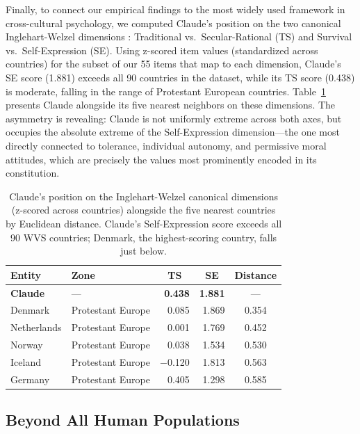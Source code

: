 \documentclass{article}
\begin{document}
Finally, to connect our empirical findings to the most widely used framework in cross-cultural psychology, we computed Claude's position on the two canonical Inglehart-Welzel dimensions \citep{inglehart2005modernization}: Traditional vs.\ Secular-Rational (TS) and Survival vs.\ Self-Expression (SE). Using z-scored item values (standardized across countries) for the subset of our 55 items that map to each dimension, Claude's SE score (1.881) exceeds all 90 countries in the dataset, while its TS score (0.438) is moderate, falling in the range of Protestant European countries. Table~\ref{tab:iw_dimensions} presents Claude alongside its five nearest neighbors on these dimensions. The asymmetry is revealing: Claude is not uniformly extreme across both axes, but occupies the absolute extreme of the Self-Expression dimension---the one most directly connected to tolerance, individual autonomy, and permissive moral attitudes, which are precisely the values most prominently encoded in its constitution.

\begin{table}[t]
\centering
\small
\caption{Claude's position on the Inglehart-Welzel canonical dimensions (z-scored across countries) alongside the five nearest countries by Euclidean distance. Claude's Self-Expression score exceeds all 90 WVS countries; Denmark, the highest-scoring country, falls just below.}
\label{tab:iw_dimensions}
\begin{tabular}{@{}llrrc@{}}
\toprule
Entity & Zone & \multicolumn{1}{c}{TS} & \multicolumn{1}{c}{SE} & Distance \\
\midrule
\textbf{Claude} & --- & \textbf{0.438} & \textbf{1.881} & --- \\
\midrule
Denmark & Protestant Europe & 0.085 & 1.869 & 0.354 \\
Netherlands & Protestant Europe & 0.001 & 1.769 & 0.452 \\
Norway & Protestant Europe & 0.038 & 1.534 & 0.530 \\
Iceland & Protestant Europe & $-$0.120 & 1.813 & 0.563 \\
Germany & Protestant Europe & 0.405 & 1.298 & 0.585 \\
\bottomrule
\end{tabular}
\end{table}

\subsection{Beyond All Human Populations}
\label{sec:extremity}
\end{document}
